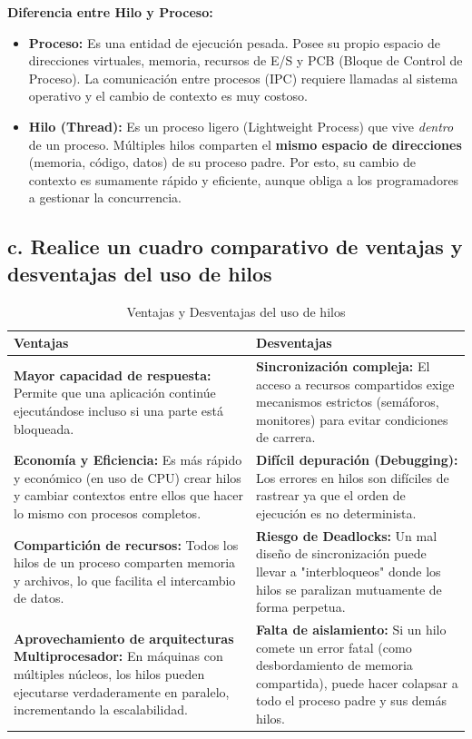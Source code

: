 \documentclass{article}
\begin{document}
\textbf{Diferencia entre Hilo y Proceso:}
\begin{itemize}
    \item \textbf{Proceso:} Es una entidad de ejecución pesada. Posee su propio espacio de direcciones virtuales, memoria, recursos de E/S y PCB (Bloque de Control de Proceso). La comunicación entre procesos (IPC) requiere llamadas al sistema operativo y el cambio de contexto es muy costoso.
    \item \textbf{Hilo (Thread):} Es un proceso ligero (Lightweight Process) que vive \textit{dentro} de un proceso. Múltiples hilos comparten el \textbf{mismo espacio de direcciones} (memoria, código, datos) de su proceso padre. Por esto, su cambio de contexto es sumamente rápido y eficiente, aunque obliga a los programadores a gestionar la concurrencia.
\end{itemize}

\subsection{c. Realice un cuadro comparativo de ventajas y desventajas del uso de hilos}

\begin{table}[H]
    \centering
    \caption{Ventajas y Desventajas del uso de hilos}
    \begin{tabular}{|p{7cm}|p{7cm}|}
    \hline
    \rowcolor{tablebackground}
    \color{white}\textbf{Ventajas} & \color{white}\textbf{Desventajas} \\
    \hline
    \textbf{Mayor capacidad de respuesta:} Permite que una aplicación continúe ejecutándose incluso si una parte está bloqueada. & \textbf{Sincronización compleja:} El acceso a recursos compartidos exige mecanismos estrictos (semáforos, monitores) para evitar condiciones de carrera. \\
    \hline
    \textbf{Economía y Eficiencia:} Es más rápido y económico (en uso de CPU) crear hilos y cambiar contextos entre ellos que hacer lo mismo con procesos completos. & \textbf{Difícil depuración (Debugging):} Los errores en hilos son difíciles de rastrear ya que el orden de ejecución es no determinista. \\
    \hline
    \textbf{Compartición de recursos:} Todos los hilos de un proceso comparten memoria y archivos, lo que facilita el intercambio de datos. & \textbf{Riesgo de Deadlocks:} Un mal diseño de sincronización puede llevar a "interbloqueos" donde los hilos se paralizan mutuamente de forma perpetua. \\
    \hline
    \textbf{Aprovechamiento de arquitecturas Multiprocesador:} En máquinas con múltiples núcleos, los hilos pueden ejecutarse verdaderamente en paralelo, incrementando la escalabilidad. & \textbf{Falta de aislamiento:} Si un hilo comete un error fatal (como desbordamiento de memoria compartida), puede hacer colapsar a todo el proceso padre y sus demás hilos. \\
    \hline
    \end{tabular}
\end{table}
\end{document}

